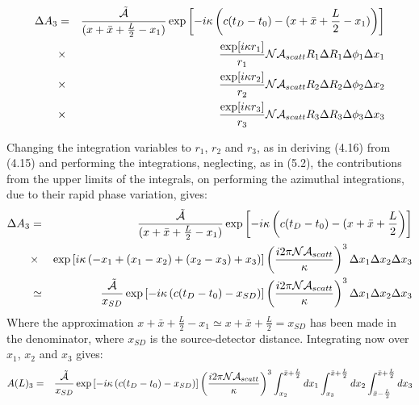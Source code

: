 \documentclass [12pt]{article}
\begin{document}
{  \begin{eqnarray}
     \Delta A_3 & = & \frac{\tilde{{\cal A}}}{(x +\bar{x} +\frac{L}{2}-x_1)}
   \exp\left[ - i \kappa\left(c(t_D-t_0)-(x + \bar{x} +\frac{L}{2}-x_1)\right)\right]
      \nonumber \\
      &\times & \frac{\exp[i \kappa r_1]}{r_1} {\cal N}{\cal A}_{scatt} R_1 \Delta R_1 \Delta \phi_1 \Delta x_1
      \nonumber \\
       &\times  & \frac{\exp[i \kappa r_2]}{r_2} {\cal N}{\cal A}_{scatt} R_2 \Delta R_2 \Delta \phi_2 \Delta x_2
     \nonumber \\
      & \times & \frac{\exp[i \kappa r_3]}{r_3} {\cal N}{\cal A}_{scatt}  R_3 \Delta R_3  \Delta \phi_3 \Delta x_3
 \end{eqnarray} 
    
     Changing the integration variables to $r_1$, $r_2$ and $r_3$, as in
     deriving (4.16) from (4.15)  and performing the integrations,
     neglecting, as in (5.2), the contributions from the upper limits of the integrals, on 
      performing the azimuthal integrations,
     due to their rapid phase variation, gives:
   \begin{eqnarray}
     \Delta A_3 & = & \frac{\tilde{{\cal A}}}{(x +\bar{x} +\frac{L}{2}-x_1)}
   \exp\left[ - i \kappa\left(c(t_D-t_0)-(x +\bar{x} +\frac{L}{2}\right)\right]
      \nonumber \\
      &\times & \exp \left [i \kappa \left( -x_1 + (x_1-x_2) + (x_2-x_3) +x_3 \right)\right]
      \left(\frac{i 2 \pi {\cal N}{\cal A}_{scatt}}{\kappa}\right)^3 \Delta x_1 \Delta x_2 \Delta x_3
      \nonumber \\
       & \simeq  &\frac{\tilde{{\cal A}}}{x_{SD}}
   \exp\left[ - i \kappa\left(c(t_D-t_0)-x_{SD}\right)\right]
      \left(\frac{i 2 \pi {\cal N}{\cal A}_{scatt}}{\kappa}\right)^3 \Delta x_1 \Delta x_2 \Delta x_3    
 \end{eqnarray} 
    Where the approximation $x +\bar{x} +\frac{L}{2}-x_1 \simeq x +\bar{x} +\frac{L}{2} = x_{SD}$
  has been made in the denominator, where $x_{SD}$ is the source-detector distance. Integrating now over $x_1$, $x_2$ 
  and $x_3$ gives:
     \begin{eqnarray}
      A(L)_3 & = & \frac{\tilde{{\cal A}}}{x_{SD}}
   \exp\left[ - i \kappa\left(c(t_D-t_0)-x_{SD}\right)\right]
      \left(\frac{i 2 \pi {\cal N}{\cal A}_{scatt}}{\kappa}\right)^3
      \int_{x_2}^{\bar{x} +\frac{L}{2}} d x_1  \int_{x_3}^{\bar{x} +\frac{L}{2}} d x_2
   \int_{\bar{x} -\frac{L}{2}}^{\bar{x} +\frac{L}{2}} dx_3
   \nonumber \\

\end{eqnarray}}
\end{document}
